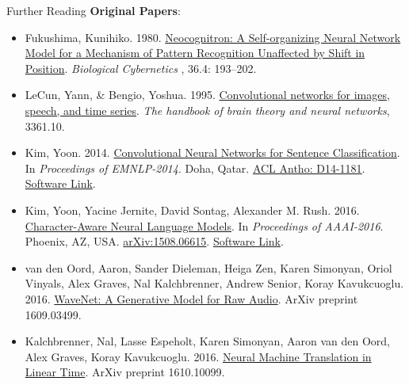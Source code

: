 \documentclass[xcolor=pdftex,x11names,table,hyperref]{beamer}
\newcommand{\Conv}{Convolutional}
\begin{document}
\begin{frame}{Further Reading}
\vspace{1.0em}
\textbf{Original Papers}:
\begin{tiny}
\begin{itemize}
	\item Fukushima, Kunihiko. 1980. \href{http://www.cs.princeton.edu/courses/archive/spr08/cos598B/Readings/Fukushima1980.pdf}{Neocognitron: A Self-organizing Neural Network Model for a Mechanism of Pattern Recognition Unaffected by Shift in Position}. \textit{Biological Cybernetics }, 36.4: 193--202.
	\item LeCun, Yann, \& Bengio, Yoshua. 1995. \href{http://www.iro.umontreal.ca/~lisa/pointeurs/handbook-convo.pdf}{\Conv{} networks for images, speech, and time series}. \textit{The handbook of brain theory and neural networks}, 3361.10.
	\item Kim, Yoon. 2014. \href{https://www.aclweb.org/anthology/D14-1181.pdf}{Convolutional Neural Networks for Sentence Classification}.  In \textit{Proceedings of EMNLP-2014}. Doha, Qatar. \href{https://www.aclweb.org/anthology/D14-1181.pdf}{ACL Antho: D14-1181}. \href{https://github.com/yoonkim/CNN_sentence}{Software Link}.
	\item Kim, Yoon, Yacine Jernite, David Sontag, Alexander M. Rush. 2016. \href{http://arxiv.org/abs/1508.06615}{Character-Aware Neural Language Models}.  In \textit{Proceedings of AAAI-2016}. Phoenix, AZ, USA. \href{http://arxiv.org/abs/1508.06615}{arXiv:1508.06615}. \href{https://github.com/yoonkim/lstm-char-cnn}{Software Link}.
	\item van den Oord, Aaron, Sander Dieleman, Heiga Zen, Karen Simonyan, Oriol Vinyals, Alex Graves, Nal Kalchbrenner, Andrew Senior, Koray Kavukcuoglu. 2016. \href{https://arxiv.org/abs/1609.03499}{WaveNet: A Generative Model for Raw Audio}.  ArXiv preprint 1609.03499.
	\item Kalchbrenner, Nal, Lasse Espeholt, Karen Simonyan, Aaron van den Oord, Alex Graves, Koray Kavukcuoglu. 2016. \href{https://arxiv.org/abs/1610.10099}{Neural Machine Translation in Linear Time}.  ArXiv preprint 1610.10099.
\end{itemize}
\end{tiny}
\end{frame}





\end{document}
